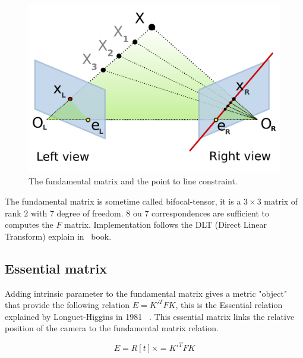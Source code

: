 \documentclass[11pt, letterpaper]{report}
\begin{document}
\begin{itemize}
\begin{figure}[h!]
\begin{center}
\includegraphics[scale=.5]{figures/Epipolar_geometry}
\caption{The fundamental matrix and the point to line constraint.}
\end{center}
\end{figure}

The fundamental matrix is sometime called bifocal-tensor, it is a \textbf{$3 \times 3$} matrix of rank $2$ with $7$ degree of freedom. $8$ ou $7$ correspondences are sufficient to computes the $F$ matrix. Implementation follows the DLT (Direct Linear Transform) explain in~\cite{Hartley2004} book.

\newpage
\subsection{Essential matrix}

Adding intrinsic parameter to the fundamental matrix gives a metric "object" that provide the following relation $E = K'^T F K$, this is the Essential relation explained by Longuet-Higgins in 1981~ \cite{LonguetHiggins81}. This essential matrix links the relative position of the camera to the fundamental matrix relation.

\begin{equation}
E = R [t]\times = K'^T F K
\end{equation}


\end{itemize}
\end{document}
